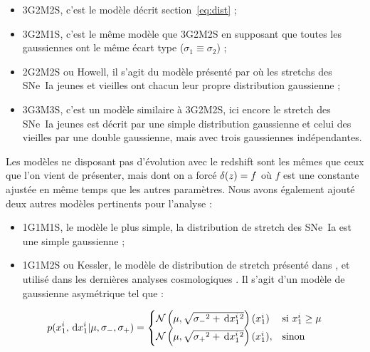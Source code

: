 \documentclass[a4paper, 12pt, svgnames]{article}
\begin{document}
\begin{itemize}

    \item 3G2M2S, c'est le modèle décrit section~\ref{eq:dist} ; 

    \item 3G2M1S, c'est le même modèle que 3G2M2S en supposant que toutes les
        gaussiennes ont le même écart type ($\sigma_1\equiv\sigma_2$) ;

    \item 2G2M2S ou Howell, il s'agit du modèle présenté par
        \cite{howell_effect_2009} où les stretchs des SNe~Ia jeunes et vieilles
        ont chacun leur propre distribution gaussienne ;

    \item 3G3M3S, c'est un modèle similaire à 3G2M2S, ici encore le stretch des
        SNe~Ia jeunes est décrit par une simple distribution gaussienne et celui
        des vieilles par une double gaussienne, mais avec trois gaussiennes
        indépendantes.

\end{itemize}

Les modèles ne disposant pas d'évolution avec le redshift sont les mêmes que
ceux que l'on vient de présenter, mais dont on a forcé $\delta(z)=f$ où $f$ est une
constante ajustée en même temps que les autres paramètres. Nous avons également
ajouté deux autres modèles pertinents pour l'analyse :

\begin{itemize}

    \item 1G1M1S, le modèle le plus simple, la distribution de stretch des
        SNe~Ia est une simple gaussienne ;

    \item 1G1M2S ou Kessler, le modèle de distribution de stretch présenté dans
        \cite{kessler_correcting_2017}, et utilisé dans les dernières analyses
        cosmologiques \cite{scolnic_complete_2018}. Il s'agit d'un modèle de
        gaussienne asymétrique tel que :

\end{itemize}

\begin{align}
 p(x_1^i, \,\mathrm{d} x_1^i | \mu, \sigma_-, \sigma_+) = 
    \begin{cases}
        \mathcal{N} \left(\mu, \sqrt{\sigma_-{}^2 + \,\mathrm{d} x_1^i{}^{2}}\right) (x_1^i) & \text{si
        } x_1^i\geq \mu\\
        \mathcal{N} \left(\mu, \sqrt{\sigma_+{}^2 + \,\mathrm{d} x_1^i{}^{2}}\right) (x_1^i), &
        \text{sinon}
    \end{cases}
\end{align} 
\end{document}
